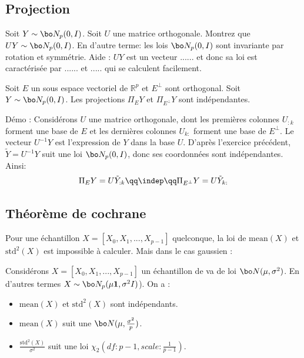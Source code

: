 \documentclass{article}
\def\std{\text{std}}
\def\mean{\mathrm{mean}}
\begin{document}
  
 
\subsection{Projection}

\begin{exo} 
Soit $Y \sim \bo N_p(0,I)$. Soit $U$ une matrice orthogonale. Montrez que   $UY \sim \bo N_p(0,I)$.  En d'autre terme: les lois $\bo N_p(0,I)$ sont invariante par rotation et symmétrie.  Aide : $UY$  est un vecteur ......   et  donc sa loi est caractérisée par ...... et .....  qui se calculent facilement. 
\end{exo}
 
 
 \begin{proposition}
 Soit $E$ un sous espace vectoriel de $\mathbb R^p$  et $E^\perp$ sont orthogonal.   Soit $Y \sim \bo N_p(0,I)$. Les projections $\Pi_E Y$ et $\Pi_{E^\perp} Y$ sont indépendantes. 
 \end{proposition}
 
 Démo : Considérons $U$ une matrice orthogonale, dont les premières colonnes $U_{:k}$ forment une base de $E$ et les dernières colonnes $U_{k:}$ forment une base de $E^\perp$.       Le vecteur $U^{-1} Y$ est l'expression de $Y$ dans la base $U$.  D'après l'exercice précédent,  $\tilde Y = U^{-1} Y$ suit une loi $\bo N_p(0,I)$, donc ses coordonnées sont  indépendantes. Ainsi: 
 $$
 \Pi_E Y = U   \tilde Y_{:k}    \qq  \indep  \qq \Pi_{E^\perp} Y  =  U   \tilde Y_{k:} 
 $$
 
 
 
 \subsection{Théorème de cochrane}
 
 Pour une échantillon $X=[X_0,X_1,...,X_{p-1}]$ quelconque, la loi de $\mean(X)$ et $\std^2(X)$ est impossible à calculer. Mais dans le cas gaussien : 
  
 
 \begin{theoreme} Considérons $X=[X_0,X_1,...,X_{p-1}]$ un échantillon de va de loi  $\bo N(\mu, \sigma ^2)$. En d'autres termes $X\sim \bo N_p(\mu \mathbf 1, \sigma^2 I )    $).      On a :
 \begin{itemize}
 \item  $\mean(X)$ et $\std^2(X)$ sont indépendants. 
 \item $\mean(X)$ suit une $\bo N(\mu ,\frac {\sigma^2} p)$. 
 \item $\frac{\std^2(X)} {\sigma^2}$ suit une loi $\chi_2(df: p-1,scale: \frac 1 {p-1})$. 
 \end{itemize}
 \end{theoreme}
 
\end{document}
